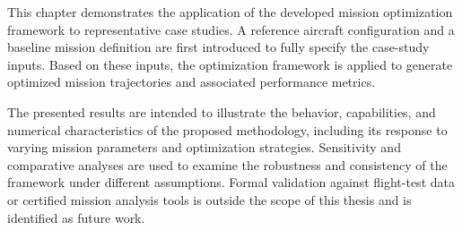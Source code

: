 This chapter demonstrates the application of the developed mission optimization framework to representative case studies. A reference aircraft configuration and a baseline mission definition are first introduced to fully specify the case-study inputs. Based on these inputs, the optimization framework is applied to generate optimized mission trajectories and associated performance metrics.

The presented results are intended to illustrate the behavior, capabilities, and numerical characteristics of the proposed methodology, including its response to varying mission parameters and optimization strategies. Sensitivity and comparative analyses are used to examine the robustness and consistency of the framework under different assumptions. Formal validation against flight-test data or certified mission analysis tools is outside the scope of this thesis and is identified as future work.